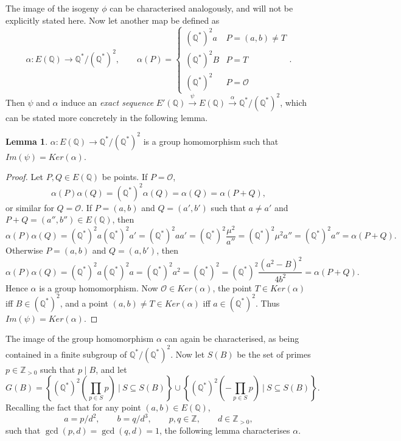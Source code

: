 \documentclass{article}
\newcommand{\Z}{\mathbb{Z}}
\newcommand{\Q}{\mathbb{Q}}
\newcommand{\rb}[1]{\left( #1 \right)}
\newcommand{\cb}[1]{\left\{ #1 \right\}}
\theoremstyle{definition}\newtheorem*{definition}{Definition}
\theoremstyle{definition}\newtheorem*{example}{Example}
\theoremstyle{definition}\newtheorem*{remark}{Remark}
\newtheorem{lemma}[proposition]{Lemma}
\begin{document}
The image of the isogeny $ \phi $ can be characterised analogously, and will not be explicitly stated here. Now let another map be defined as
$$ \alpha : E\rb{\Q} \to \Q^* / \rb{\Q^*}^2, \qquad \alpha\rb{P} = \begin{cases} \rb{\Q^*}^2a & P = \rb{a, b} \ne T \\ \rb{\Q^*}^2B & P = T \\ \rb{\Q^*}^2 & P = \mathcal{O} \end{cases}. $$
Then $ \psi $ and $ \alpha $ induce an \emph{exact sequence} $ E'\rb{\Q} \xrightarrow{\psi} E\rb{\Q} \xrightarrow{\alpha} \Q^* / \rb{\Q^*}^2 $, which can be stated more concretely in the following lemma.

\begin{lemma}
$ \alpha : E\rb{\Q} \to \Q^* / \rb{\Q^*}^2 $ is a group homomorphism such that $ Im\rb{\psi} = Ker\rb{\alpha} $.
\end{lemma}

\begin{proof}
Let $ P, Q \in E\rb{\Q} $ be points. If $ P = \mathcal{O} $,
$$ \alpha\rb{P}\alpha\rb{Q} = \rb{\Q^*}^2\alpha\rb{Q} = \alpha\rb{Q} = \alpha\rb{P + Q}, $$
or similar for $ Q = \mathcal{O} $. If $ P = \rb{a, b} $ and $ Q = \rb{a', b'} $ such that $ a \ne a' $ and $ P + Q = \rb{a'', b''} \in E\rb{\Q} $, then
$$ \alpha\rb{P}\alpha\rb{Q} = \rb{\Q^*}^2a\rb{\Q^*}^2a' = \rb{\Q^*}^2aa' = \rb{\Q^*}^2\dfrac{\mu^2}{a''} = \rb{\Q^*}^2\mu^2a'' = \rb{\Q^*}^2a'' = \alpha\rb{P + Q}. $$
Otherwise $ P = \rb{a, b} $ and $ Q = \rb{a, b'} $, then
$$ \alpha\rb{P}\alpha\rb{Q} = \rb{\Q^*}^2a\rb{\Q^*}^2a = \rb{\Q^*}^2a^2 = \rb{\Q^*}^2 = \rb{\Q^*}^2\dfrac{\rb{a^2 - B}^2}{4b^2} = \alpha\rb{P + Q}. $$
Hence $ \alpha $ is a group homomorphism. Now $ \mathcal{O} \in Ker\rb{\alpha} $, the point $ T \in Ker\rb{\alpha} $ iff $ B \in \rb{\Q^*}^2 $, and a point $ \rb{a, b} \ne T \in Ker\rb{\alpha} $ iff $ a \in \rb{\Q^*}^2 $. Thus $ Im\rb{\psi} = Ker\rb{\alpha} $.
\end{proof}

The image of the group homomorphism $ \alpha $ can again be characterised, as being contained in a finite subgroup of $ \Q^* / \rb{\Q^*}^2 $. Now let $ S\rb{B} $ be the set of primes $ p \in \Z_{> 0} $ such that $ p \mid B $, and let
$$ G\rb{B} = \cb{\rb{\Q^*}^2\rb{\prod_{p \in S} p} \ \Bigg| \ S \subseteq S\rb{B}} \cup \cb{\rb{\Q^*}^2\rb{-\prod_{p \in S} p} \ \Bigg| \ S \subseteq S\rb{B}}. $$
Recalling the fact that for any point $ \rb{a, b} \in E\rb{\Q} $,
$$ a = p / d^2, \qquad b = q / d^3, \qquad p, q \in \Z, \qquad d \in \Z_{> 0}, $$ such that $ \gcd\rb{p, d} = \gcd\rb{q, d} = 1 $, the following lemma characterises $ \alpha $.
\end{document}
